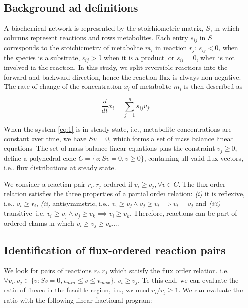 \documentclass[12pt]{article}
\begin{document}
\subsection{Background ad definitions}
\label{subsection: Definitions}
A biochemical network is represented by the stoichiometric matrix, $S$, in which columns represent reactions and rows metabolites. Each entry $s_{ij}$ in $S$ corresponds to the stoichiometry of metabolite $m_i$ in reaction $r_j$: $s_{ij} < 0$, when the species is a substrate, $s_{ij} > 0$ when it is a product, or $s_{ij} = 0$, when is not involved in the reaction. In this study, we split reversible reactions into the forward and backward direction, hence the reaction flux is always non-negative. The rate of change of the concentration $x_i$ of metabolite $m_i$ is then described as

\begin{equation}
\label{eq:1}
\frac{d}{dt} x_i = \sum_{j=1}^{n} s_{ij}v_j.
\end{equation}

When the system \ref{eq:1} is in steady state, i.e., metabolite concentrations are constant over time, we have $Sv = 0$, which forms a set of mass balance linear equations. The set of mass balance linear equations plus the constraint $v_j \geq 0$, define a polyhedral cone $C = \{v:Sv = 0, v\geq0\}$, containing all valid flux vectors, i.e., flux distributions at steady state.

We consider a reaction pair $r_i, r_j$ ordered if $v_i \geq v_j, \forall v \in C$. The flux order relation satisfies the three properties of a partial order relation: \emph{(i)} it is reflexive, i.e., $v_i \geq v_i$, \emph{(ii)} antisymmetric, i.e., $v_i \geq v_j \wedge v_j \geq v_i \implies v_i= v_j$ and \emph{(iii)} transitive, i.e, $v_i\geq v_j \wedge v_j\geq v_k \implies v_i\geq v_k$. Therefore, reactions can be part of ordered chains in which $v_i \geq v_j \geq v_k \dots$.

\subsection{Identification of flux-ordered reaction pairs}
\label{subsection:FluxOrderIdentification}
We look for pairs of reactions $r_i, r_j$ which satisfy the flux order relation, i.e. $\forall v_i,v_j \in \{v : Sv = 0, v_{min} \leq v \leq v_{max}\}$, $v_i \geq v_j$. To this end, we can evaluate the ratio of fluxes in the feasible region, i.e., we need $v_i / v_j \geq 1$. We can evaluate the ratio with the following linear-fractional program:
\end{document}
